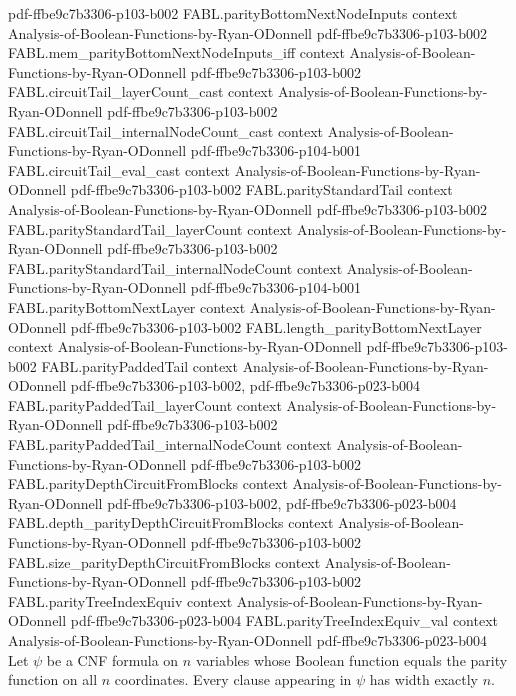 \begin{theorem}
  {pdf-ffbe9c7b3306-p103-b002}
\proofstep
  {FABL.parityBottomNextNodeInputs}
  {context}
  {Analysis-of-Boolean-Functions-by-Ryan-ODonnell}
  {pdf-ffbe9c7b3306-p103-b002}
\proofstep
  {FABL.mem_parityBottomNextNodeInputs_iff}
  {context}
  {Analysis-of-Boolean-Functions-by-Ryan-ODonnell}
  {pdf-ffbe9c7b3306-p103-b002}
\proofstep
  {FABL.circuitTail_layerCount_cast}
  {context}
  {Analysis-of-Boolean-Functions-by-Ryan-ODonnell}
  {pdf-ffbe9c7b3306-p103-b002}
\proofstep
  {FABL.circuitTail_internalNodeCount_cast}
  {context}
  {Analysis-of-Boolean-Functions-by-Ryan-ODonnell}
  {pdf-ffbe9c7b3306-p104-b001}
\proofstep
  {FABL.circuitTail_eval_cast}
  {context}
  {Analysis-of-Boolean-Functions-by-Ryan-ODonnell}
  {pdf-ffbe9c7b3306-p103-b002}
\proofstep
  {FABL.parityStandardTail}
  {context}
  {Analysis-of-Boolean-Functions-by-Ryan-ODonnell}
  {pdf-ffbe9c7b3306-p103-b002}
\proofstep
  {FABL.parityStandardTail_layerCount}
  {context}
  {Analysis-of-Boolean-Functions-by-Ryan-ODonnell}
  {pdf-ffbe9c7b3306-p103-b002}
\proofstep
  {FABL.parityStandardTail_internalNodeCount}
  {context}
  {Analysis-of-Boolean-Functions-by-Ryan-ODonnell}
  {pdf-ffbe9c7b3306-p104-b001}
\proofstep
  {FABL.parityBottomNextLayer}
  {context}
  {Analysis-of-Boolean-Functions-by-Ryan-ODonnell}
  {pdf-ffbe9c7b3306-p103-b002}
\proofstep
  {FABL.length_parityBottomNextLayer}
  {context}
  {Analysis-of-Boolean-Functions-by-Ryan-ODonnell}
  {pdf-ffbe9c7b3306-p103-b002}
\proofstep
  {FABL.parityPaddedTail}
  {context}
  {Analysis-of-Boolean-Functions-by-Ryan-ODonnell}
  {pdf-ffbe9c7b3306-p103-b002,
    pdf-ffbe9c7b3306-p023-b004}
\proofstep
  {FABL.parityPaddedTail_layerCount}
  {context}
  {Analysis-of-Boolean-Functions-by-Ryan-ODonnell}
  {pdf-ffbe9c7b3306-p103-b002}
\proofstep
  {FABL.parityPaddedTail_internalNodeCount}
  {context}
  {Analysis-of-Boolean-Functions-by-Ryan-ODonnell}
  {pdf-ffbe9c7b3306-p103-b002}
\proofstep
  {FABL.parityDepthCircuitFromBlocks}
  {context}
  {Analysis-of-Boolean-Functions-by-Ryan-ODonnell}
  {pdf-ffbe9c7b3306-p103-b002,
    pdf-ffbe9c7b3306-p023-b004}
\proofstep
  {FABL.depth_parityDepthCircuitFromBlocks}
  {context}
  {Analysis-of-Boolean-Functions-by-Ryan-ODonnell}
  {pdf-ffbe9c7b3306-p103-b002}
\proofstep
  {FABL.size_parityDepthCircuitFromBlocks}
  {context}
  {Analysis-of-Boolean-Functions-by-Ryan-ODonnell}
  {pdf-ffbe9c7b3306-p103-b002}
\proofstep
  {FABL.parityTreeIndexEquiv}
  {context}
  {Analysis-of-Boolean-Functions-by-Ryan-ODonnell}
  {pdf-ffbe9c7b3306-p023-b004}
\proofstep
  {FABL.parityTreeIndexEquiv_val}
  {context}
  {Analysis-of-Boolean-Functions-by-Ryan-ODonnell}
  {pdf-ffbe9c7b3306-p023-b004}
Let $\psi$ be a CNF formula on $n$ variables whose Boolean function equals the parity
function on all $n$ coordinates. Every clause appearing in $\psi$ has width exactly
$n$.
\end{theorem}

